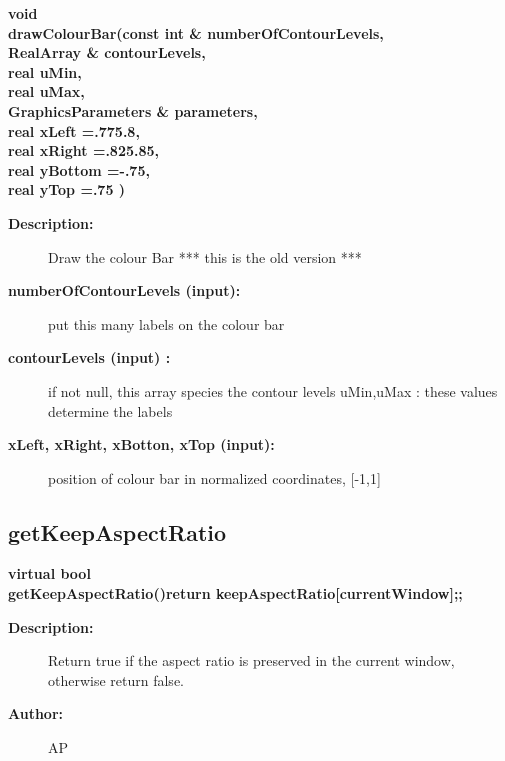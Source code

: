 \begin{flushleft} \textbf{%
void   \\ 
\settowidth{\GLGraphicsInterfaceIncludeArgIndent}{drawColourBar(}%
drawColourBar(const int \& numberOfContourLevels,\\ 
\hspace{\GLGraphicsInterfaceIncludeArgIndent}RealArray \& contourLevels,\\ 
\hspace{\GLGraphicsInterfaceIncludeArgIndent}real uMin,\\ 
\hspace{\GLGraphicsInterfaceIncludeArgIndent}real uMax,\\ 
\hspace{\GLGraphicsInterfaceIncludeArgIndent}GraphicsParameters \& parameters,\\ 
\hspace{\GLGraphicsInterfaceIncludeArgIndent}real xLeft    =.775.8,\\ 
\hspace{\GLGraphicsInterfaceIncludeArgIndent}real xRight   =.825.85,\\ 
\hspace{\GLGraphicsInterfaceIncludeArgIndent}real yBottom  =-.75,\\ 
\hspace{\GLGraphicsInterfaceIncludeArgIndent}real yTop     =.75 )
}\end{flushleft}
\begin{description}
\item[{\bf Description:}] 
       Draw the colour Bar *** this is the old version ***
\item[{\bf numberOfContourLevels (input):}]  put this many labels on the colour bar 
\item[{\bf contourLevels (input) :}]  if not null, this array species the contour levels
  uMin,uMax : these values determine the labels
\item[{\bf xLeft, xRight, xBotton, xTop (input):}]  position of colour bar in normalized coordinates, [-1,1]
\end{description}
\subsection{getKeepAspectRatio}
 
\begin{flushleft} \textbf{%
virtual bool \\ 
\settowidth{\GLGraphicsInterfaceIncludeArgIndent}{getKeepAspectRatio(}%
getKeepAspectRatio(){return keepAspectRatio[currentWindow];};\\ 
}\end{flushleft}
\begin{description}
\item[{\bf Description:}] 
 Return true if the aspect ratio is preserved in the current window, otherwise return false.
\item[{\bf Author:}]  AP
\end{description}
